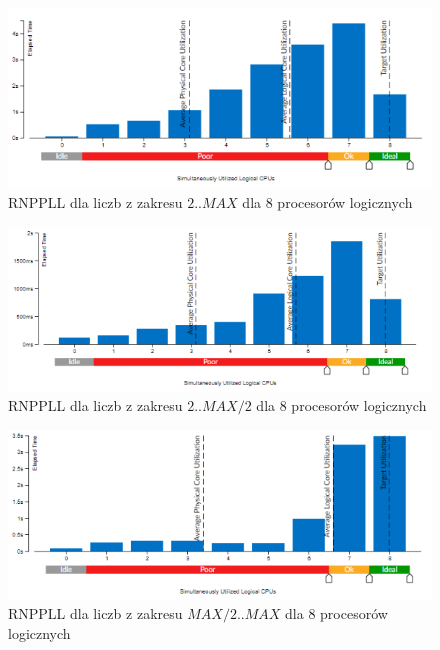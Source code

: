 \documentclass{article}
\begin{document}
                \begin{figure}[H]
                    \includegraphics[width=13cm]{rownolegly_domain_bezsita8_2_MAX}
                    \caption{\gls{RNPPLL} dla liczb z zakresu $2 .. MAX$ dla 8 procesorów logicznych}
                \end{figure}
                \begin{figure}[H]
                    \includegraphics[width=13cm]{rownolegly_domain_bezsita8_2_MAX2}
                    \caption{\gls{RNPPLL} dla liczb z zakresu $2 .. MAX / 2$ dla 8 procesorów logicznych}
                \end{figure}
                \begin{figure}[H]
                    \includegraphics[width=13cm]{rownolegly_domain_bezsita8_MAX2_MAX}
                    \caption{\gls{RNPPLL} dla liczb z zakresu $MAX / 2 .. MAX$ dla 8 procesorów logicznych}
                \end{figure}
                
\end{document}
